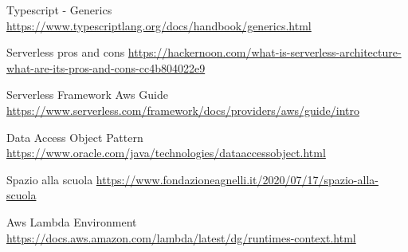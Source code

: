 \begin{thebibliography}{9}
     Typescript - Generics
    \url{https://www.typescriptlang.org/docs/handbook/generics.html}

     Serverless pros and cons
    \url{https://hackernoon.com/what-is-serverless-architecture-what-are-its-pros-and-cons-cc4b804022e9}

     Serverless Framework Aws Guide
    \url{https://www.serverless.com/framework/docs/providers/aws/guide/intro}

     Data Access Object Pattern
    \url{https://www.oracle.com/java/technologies/dataaccessobject.html}

     Spazio alla scuola
    \url{https://www.fondazioneagnelli.it/2020/07/17/spazio-alla-scuola}

     Aws Lambda Environment
    \url{https://docs.aws.amazon.com/lambda/latest/dg/runtimes-context.html}

\end{thebibliography}
